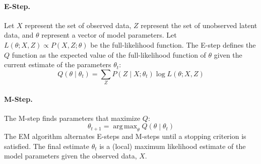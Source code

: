 \paragraph{E-Step.}
Let $X$ represent the set of observed data, $Z$ represent the set of unobserved latent data, and $\theta$ represent a vector of model parameters. Let $L(\theta; X, Z) \propto P(X, Z ; \theta)$ be the full-likelihood function. The E-step defines the $Q$ function as the expected value of the full-likelihood function of $\theta$ given the current estimate of the parameters $\theta_t$:
%
\begin{equation}
    Q\left(\theta \middle| \theta_t \right) =
    \sum_Z P\left(Z \middle| X ; \theta_t\right) \log L\left(\theta ; X, Z\right)
\end{equation}
%
\paragraph{M-Step.}
The M-step finds parameters that maximize $Q$:
%
\begin{equation}
    \theta_{t+1} = \mathop{\mathrm{arg\,max}}_\theta  Q\left(\theta \middle| \theta_t \right)
\end{equation}
%
The EM algorithm alternates E-steps and M-steps until a stopping criterion is satisfied. The final estimate $\theta_t$ is a (local) maximum likelihood estimate of the model parameters given the observed data, $X$.


